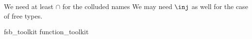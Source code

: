 
We need at least $\cap$ for the colluded names
We may need $\inj$ as well for the case of free types.
\begin{zsection}
   \SECTION fsb\_toolkit \parents function\_toolkit
\end{zsection}
